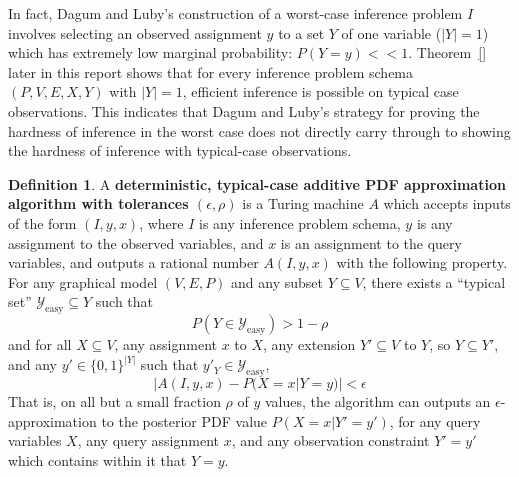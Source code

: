 \documentclass{article}
\theoremstyle{definition}
\newtheorem{defn}{Definition}
\theoremstyle{remark}
\begin{document}
In fact, Dagum and Luby's construction of a worst-case inference problem $I$ involves selecting an observed assignment $y$ to a set $Y$ of one variable ($|Y| = 1$) which has extremely low marginal probability: $P(Y = y) << 1$.
Theorem~\ref{} later in this report shows that for every inference problem schema $(P, V, E, X, Y)$ with $|Y| = 1$, efficient inference is possible on typical case observations.
This indicates that Dagum and Luby's strategy for proving the hardness of inference in the worst case does not directly carry through to showing the hardness of inference with typical-case observations.


\begin{defn} \label{def:typical_case_add_alg}
A \textbf{deterministic, typical-case additive PDF approximation algorithm with tolerances $(\epsilon, \rho)$} is a Turing machine $A$ which accepts inputs of the form
$(I, y, x)$, where $I$ is any inference problem schema, $y$ is any assignment to the observed variables, and $x$ is an assignment to the query variables, and outputs a rational number $A(I, y, x)$ with the following property.
For any graphical model $(V, E, P)$ and any subset $Y \subseteq V$,
there exists a ``typical set'' $\mathcal{Y}_\text{easy} \subseteq Y$ such
that $$P(Y \in \mathcal{Y}_\text{easy}) > 1 - \rho$$ and
for all $X \subseteq V$, any assignment $x$ to $X$,
any extension $Y' \subseteq V$ to $Y$, so $Y \subseteq Y'$,
and any $y' \in \{0, 1\}^{|Y|}$ such that $y'_Y \in \mathcal{Y}_\text{easy}$,
$$
|A(I, y, x) - P(X = x | Y = y)| < \epsilon
$$
That is, on all but a small fraction $\rho$ of $y$ values, the algorithm can outputs an $\epsilon$-approximation to the posterior PDF value $P(X = x | Y' = y')$,
for any query variables $X$, any query assignment $x$,
and any observation constraint $Y' = y'$ which contains within it that $Y = y$.
\end{defn}
\end{document}
